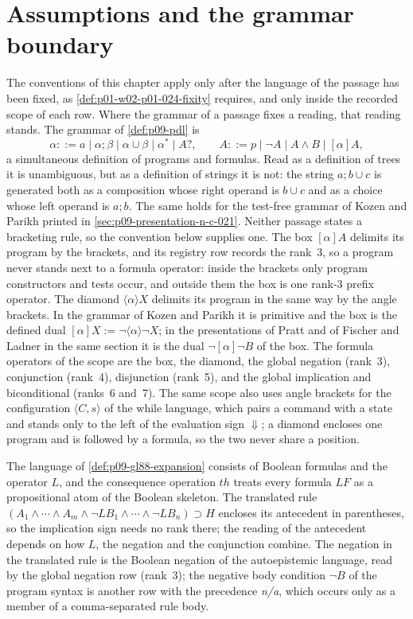 \section{Assumptions and the grammar boundary}
\label{sec:p01-w02c-p01-017-assumptions}

The conventions of this chapter apply only after the language of the
passage has been fixed, as \cref{def:p01-w02-p01-024-fixity} requires,
and only inside the recorded scope of each row.  Where the grammar of a
passage fixes a reading, that reading stands.  The grammar of
\cref{def:p09-pdl} is
\[
 \alpha::=a\mid\alpha;\beta\mid\alpha\cup\beta\mid\alpha^{*}\mid A?,
 \qquad
 A::=p\mid\neg A\mid A\land B\mid[\alpha]A,
\]
a simultaneous definition of programs and formulas.  Read as a definition
of trees it is unambiguous, but as a definition of strings it is not: the
string \(a;b\cup c\) is generated both as a composition whose right
operand is \(b\cup c\) and as a choice whose left operand is \(a;b\).  The
same holds for the test-free grammar of Kozen and Parikh printed in
\cref{sec:p09-presentation-n-c-021}.  Neither passage states a bracketing
rule, so the convention below supplies one.  The box \([\alpha]A\)
delimits its program by the brackets, and its registry row records the
rank~3, so a program never stands next to a formula operator: inside the
brackets only program constructors and tests occur, and outside them the
box is one rank-3 prefix operator.  The diamond \(\langle\alpha\rangle X\)
delimits its program in the same way by the angle brackets.  In the
grammar of Kozen and Parikh it is primitive and the box is the defined
dual \([\alpha]X:=\neg\langle\alpha\rangle\neg X\); in the presentations
of Pratt and of Fischer and Ladner in the same section it is the dual
\(\neg[\alpha]\neg B\) of the box.  The formula operators of the scope are
the box, the diamond, the global negation (rank~3), conjunction (rank~4),
disjunction (rank~5), and the global implication and biconditional
(ranks~6 and~7).  The same scope also uses angle brackets for the
configuration \(\langle C,s\rangle\) of the while language, which pairs a
command with a state and stands only to the left of the evaluation sign
\(\Downarrow\); a diamond encloses one program and is followed by a
formula, so the two never share a position.

The language of \cref{def:p09-gl88-expansion} consists of Boolean formulas
and the operator \(L\), and the consequence operation \(th\) treats every
formula \(LF\) as a propositional atom of the Boolean skeleton.  The
translated rule
\((A_1\land\cdots\land A_m\land\neg LB_1\land\cdots\land\neg LB_n)\supset H\)
encloses its antecedent in parentheses, so the implication sign needs no
rank there; the reading of the antecedent depends on how \(L\), the
negation and the conjunction combine.  The negation in the translated
rule is the Boolean negation of the autoepistemic language, read by the
global negation row (rank~3); the negative body condition \(\neg B\) of
the program syntax is another row with the precedence \emph{n/a}, which
occurs only as a member of a comma-separated rule body.

